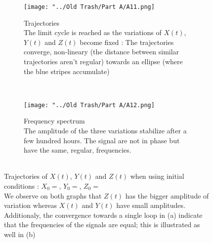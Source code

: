 \documentclass[10pt,a4paper,oneside,twocolumn]{article}
\numberwithin{equation}{section} %
\begin{document}
    \begin{figure}[!h]
	\begin{subfigure}[b]{0.5\textwidth}
	    \texttt{[image: "../Old Trash/Part A/A11.png]}
	    \caption{Trajectories\\
	    The limit cycle is reached as the variations of $X(t)$, $Y(t)$ and $Z(t)$ become fixed : The trajectories converge, non-lineary (the distance between similar trajectories aren't regular) towards an ellipse (where the blue stripes accumulate)}
	\end{subfigure}
	~
	\begin{subfigure}[b]{0.5\textwidth}
	    \texttt{[image: "../Old Trash/Part A/A12.png]}
	    \caption{Frequency spectrum \\
	    The amplitude of the three variations stabilize after a few hundred hours. The signal are not in phase but have the same, regular, frequencies.}
	\end{subfigure}
	\caption{\\Trajectories of $X(t)$, $Y(t)$ and $Z(t)$ when using initial conditions : $X_0 = $, $Y_0 = $, $Z_0 = $ \\ We observe on both graphs that $Z(t)$ has the bigger amplitude of variation whereas $X(t)$ and $Y(t)$ have small amplitudes. Additionaly, the convergence towards a single loop in (a) indicate that the frequencies of the signals are equal; this is illustrated as well in (b)
	}
    \end{figure}
\end{document}

